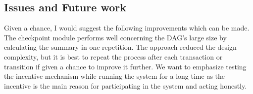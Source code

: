 \subsection{Issues and Future work}
Given a chance, I would suggest the following improvements which can be made.
The checkpoint module performs well concerning the DAG's large size by calculating the summary in one repetition. The approach reduced the design complexity, but it is best to repeat the process after each transaction or transition if given a chance to improve it further. 
We want to emphasize testing the incentive mechanism while running the system for a long time as the incentive is the main reason for participating in the system and acting honestly.
